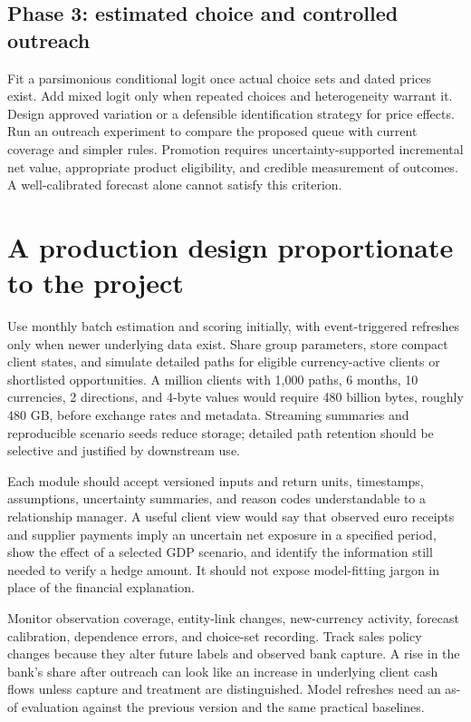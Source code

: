 \subsection{Phase 3: estimated choice and controlled outreach}
Fit a parsimonious conditional logit once actual choice sets and dated prices exist. Add mixed logit only when repeated choices and heterogeneity warrant it. Design approved variation or a defensible identification strategy for price effects. Run an outreach experiment to compare the proposed queue with current coverage and simpler rules. Promotion requires uncertainty-supported incremental net value, appropriate product eligibility, and credible measurement of outcomes. A well-calibrated forecast alone cannot satisfy this criterion.

\section{A production design proportionate to the project}
Use monthly batch estimation and scoring initially, with event-triggered refreshes only when newer underlying data exist. Share group parameters, store compact client states, and simulate detailed paths for eligible currency-active clients or shortlisted opportunities. A million clients with 1,000 paths, 6 months, 10 currencies, 2 directions, and 4-byte values would require 480 billion bytes, roughly 480 GB, before exchange rates and metadata. Streaming summaries and reproducible scenario seeds reduce storage; detailed path retention should be selective and justified by downstream use.

Each module should accept versioned inputs and return units, timestamps, assumptions, uncertainty summaries, and reason codes understandable to a relationship manager. A useful client view would say that observed euro receipts and supplier payments imply an uncertain net exposure in a specified period, show the effect of a selected GDP scenario, and identify the information still needed to verify a hedge amount. It should not expose model-fitting jargon in place of the financial explanation.

Monitor observation coverage, entity-link changes, new-currency activity, forecast calibration, dependence errors, and choice-set recording. Track sales policy changes because they alter future labels and observed bank capture. A rise in the bank's share after outreach can look like an increase in underlying client cash flows unless capture and treatment are distinguished. Model refreshes need an as-of evaluation against the previous version and the same practical baselines.

